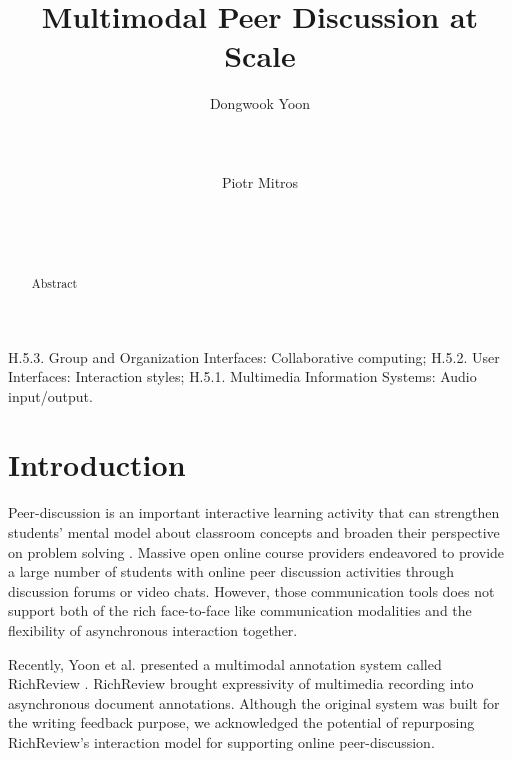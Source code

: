 \documentclass{sigchi}
\begin{document}
\title{Multimodal Peer Discussion at Scale}

\author{
  \alignauthor Dongwook Yoon\\
    \\
    \\
    \\
  \alignauthor Piotr Mitros\\
    \\
    \\
    \\
}

\maketitle

\begin{abstract}
Abstract
\end{abstract}


\category
{H.5.3.} Group and Organization Interfaces: Collaborative computing; {H.5.2.} User Interfaces: Interaction styles; {H.5.1.} Multimedia Information Systems: Audio input/output.

\section{Introduction}

Peer-discussion is an important interactive learning activity that can strengthen students’ mental model about classroom concepts \cite{nicol2003peer} and broaden their perspective on problem solving \cite{smith2009peer}.
Massive open online course providers endeavored to provide a large number of students with online peer discussion activities through discussion forums or video chats.
However, those communication tools does not support both of the rich face-to-face like communication modalities and the flexibility of asynchronous interaction together.

Recently, Yoon et al. presented a multimodal annotation system called RichReview \cite{yoon2014richreview}.
RichReview brought expressivity of multimedia recording into asynchronous document annotations.
Although the original system was built for the writing feedback purpose, we acknowledged the potential of repurposing RichReview's interaction model for supporting online peer-discussion.
\end{document}
